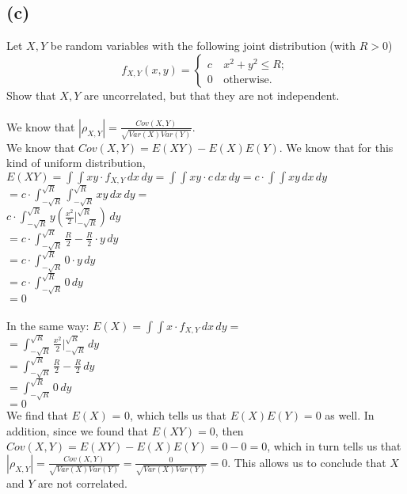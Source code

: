 \documentclass{article}
\begin{document}
{\subsection*{(c)}
Let $X,Y$ be random variables with the following joint
distribution (with $R>0$)
\[
f_{X,Y}\left(x,y\right)=\begin{cases}
c & \,x^{2}+y^{2}\le R;\\
0 & \,\mbox{otherwise}.
\end{cases}
\]
Show that $X,Y$ are uncorrelated, but that they are not independent. \\ \\
We know that $|\rho_{X, Y}| = \frac{Cov(X, Y)}{\sqrt{Var(X)Var(Y)}}$. \\ 
We know that $Cov(X, Y) = E(XY) - E(X)E(Y)$. We know that for this kind of uniform distribution, $E(XY) = \int \int xy \cdot f_{X, Y} \,dx \,dy = \int \int xy \cdot c \,dx \,dy = c \cdot \int \int xy \,dx \,dy$ \\ 
$ = c \cdot \int_{-\sqrt{R}}^{\sqrt{R}} \int_{-\sqrt{R}}^{\sqrt{R}} xy \,dx \,dy =$ \\ 
$ c \cdot \int_{-\sqrt{R}}^{\sqrt{R}} y (\frac{x^2}{2} |_{-\sqrt{R}}^{\sqrt{R}}) \,dy$ \\ 
$ = c \cdot \int_{-\sqrt{R}}^{\sqrt{R}} \frac{R}{2} - \frac{R}{2} \cdot y \,dy$ \\
$ = c \cdot \int_{-\sqrt{R}}^{\sqrt{R}} 0 \cdot y \,dy$ \\
$ = c \cdot \int_{-\sqrt{R}}^{\sqrt{R}} 0\,dy$ \\
$ = 0$ \\ \\ 
In the same way: $E(X) = \int \int x \cdot f_{X, Y} \,dx \,dy = $ \\ 
$= \int_{-\sqrt{R}}^{\sqrt{R}} \frac{x^2}{2} |_{-\sqrt{R}}^{\sqrt{R}} \,dy $ \\ 
$= \int_{-\sqrt{R}}^{\sqrt{R}} \frac{R}{2} - \frac{R}{2} \,dy $ \\ 
$= \int_{-\sqrt{R}}^{\sqrt{R}} 0 \,dy $ \\ 
$= 0$ \\ 
We find that $E(X)$ = 0, which tells us that $E(X)E(Y) = 0$ as well. In addition, since we found that $E(XY) = 0$, then $Cov(X,Y) = E(XY) - E(X)E(Y) = 0 - 0 = 0$, which in turn tells us that $|\rho_{X, Y}| = \frac{Cov(X, Y)}{\sqrt{Var(X)Var(Y)}} = \frac{0}{\sqrt{Var(X)Var(Y)}} = 0$. This allows us to conclude that $X$ and $Y$ are not correlated. \\ \\
}
\end{document}
